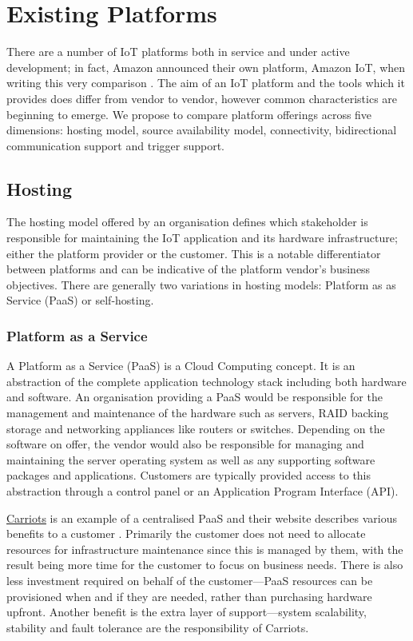   \section{Existing Platforms}
  \label{existing-platforms}
    There are a number of IoT platforms both in service and under active development; in fact, Amazon announced their own platform, Amazon IoT, when writing this very comparison \citep{AmazonIoT}. The aim of an IoT platform and the tools which it provides does differ from vendor to vendor, however common characteristics are beginning to emerge. We propose to compare platform offerings across five dimensions: hosting model, source availability model, connectivity, bidirectional communication support and trigger support.

    \subsection{Hosting}
      The hosting model offered by an organisation defines which stakeholder is responsible for maintaining the IoT application and its hardware infrastructure; either the platform provider or the customer. This is a notable differentiator between platforms and can be indicative of the platform vendor's business objectives. There are generally two variations in hosting models: Platform as as Service (PaaS) or self-hosting.

      \subsubsection{Platform as a Service}
        A Platform as a Service (PaaS) is a Cloud Computing concept. It is an abstraction of the complete application technology stack including both hardware and software. An organisation providing a PaaS would be responsible for the management and maintenance of the hardware such as servers, RAID backing storage and networking appliances like routers or switches. Depending on the software on offer, the vendor would also be responsible for managing and maintaining the server operating system as well as any supporting software packages and applications. Customers are typically provided access to this abstraction through a control panel or an Application Program Interface (API).

        \href{https://www.carriots.com/}{Carriots} is an example of a centralised PaaS and their website describes various benefits to a customer \citep{CarriotsBenefits}. Primarily the customer does not need to allocate resources for infrastructure maintenance since this is managed by them, with the result being more time for the customer to focus on business needs. There is also less investment required on behalf of the customer---PaaS resources can be provisioned when and if they are needed, rather than purchasing hardware upfront. Another benefit is the extra layer of support---system scalability, stability and fault tolerance are the responsibility of Carriots.

